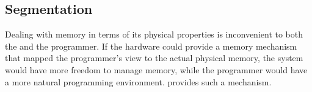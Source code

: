 \subsection{Segmentation}\label{subsec:Segmentation}
Dealing with memory in terms of its physical properties is inconvenient to both the  and the programmer.
If the hardware could provide a memory mechanism that mapped the programmer’s view to the actual physical memory, the system would have more freedom to manage memory, while the programmer would have a more natural programming environment.
 provides such a mechanism.



